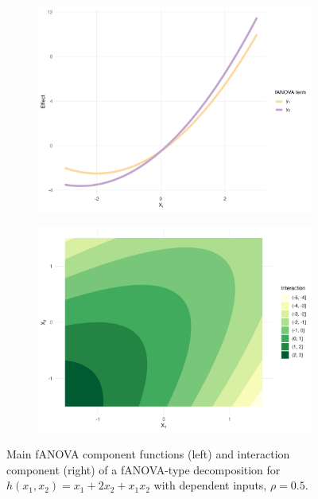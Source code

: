 \begin{figure}[htpb]
    \centering
    \begin{subfigure}[t]{0.49\textwidth}
        \centering
        \includegraphics[width=\textwidth]{images/experiment_section/hoeffding_rho05_main.png}
    \end{subfigure}%
    \hfill
    \begin{subfigure}[t]{0.49\textwidth}
        \centering
        \includegraphics[width=\textwidth]{images/experiment_section/hoeffding_rho05_interaction.png}
    \end{subfigure}
    \caption{Main fANOVA component functions (left) and interaction component (right) of a fANOVA-type decomposition for $h(x_1, x_2) = x_1 + 2 x_2 + x_1 x_2$ with dependent inputs, $\rho = 0.5$.}
    \label{fig:hoeffding_rho05}
\end{figure}
